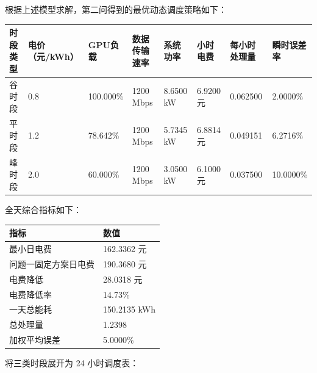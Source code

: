 \documentclass[
]{article}
\begin{document}
根据上述模型求解，第二问得到的最优动态调度策略如下：

\begin{longtable}[]{@{}llllllll@{}}
\toprule\noalign{}
时段类型 & 电价（元/kWh） & GPU负载 & 数据传输速率 & 系统功率 & 小时电费
& 每小时处理量 & 瞬时误差率 \\
\midrule\noalign{}
\endhead
\bottomrule\noalign{}
\endlastfoot
谷时段 & 0.8 & 100.000\% & 1200 Mbps & 8.6500 kW & 6.9200 元 & 0.062500
& 2.0000\% \\
平时段 & 1.2 & 78.642\% & 1200 Mbps & 5.7345 kW & 6.8814 元 & 0.049151 &
6.2716\% \\
峰时段 & 2.0 & 60.000\% & 1200 Mbps & 3.0500 kW & 6.1000 元 & 0.037500 &
10.0000\% \\
\end{longtable}

全天综合指标如下：

\begin{longtable}[]{@{}ll@{}}
\toprule\noalign{}
指标 & 数值 \\
\midrule\noalign{}
\endhead
\bottomrule\noalign{}
\endlastfoot
最小日电费 & 162.3362 元 \\
问题一固定方案日电费 & 190.3680 元 \\
电费降低 & 28.0318 元 \\
电费降低率 & 14.73\% \\
一天总能耗 & 150.2135 kWh \\
总处理量 & 1.2398 \\
加权平均误差 & 5.0000\% \\
\end{longtable}

将三类时段展开为 24 小时调度表：
\end{document}
